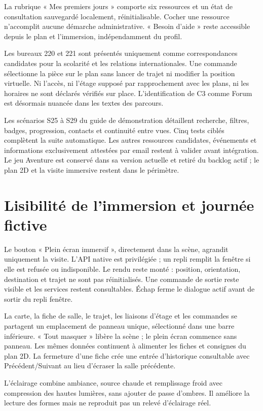\documentclass[11pt,a4paper]{article}
\begin{document}
La rubrique « Mes premiers jours » comporte six ressources et un état de consultation sauvegardé localement, réinitialisable. Cocher une ressource n'accomplit aucune démarche administrative. « Besoin d'aide » reste accessible depuis le plan et l'immersion, indépendamment du profil.

Les bureaux 220 et 221 sont présentés uniquement comme correspondances candidates pour la scolarité et les relations internationales. Une commande sélectionne la pièce sur le plan sans lancer de trajet ni modifier la position virtuelle. Ni l'accès, ni l'étage supposé par rapprochement avec les plans, ni les horaires ne sont déclarés vérifiés sur place. L'identification de C3 comme Forum est désormais nuancée dans les textes des parcours.

Les scénarios S25 à S29 du guide de démonstration détaillent recherche, filtres, badges, progression, contacts et continuité entre vues. Cinq tests ciblés complètent la suite automatique. Les autres ressources candidates, événements et informations exclusivement attestées par email restent à valider avant intégration. Le jeu Aventure est conservé dans sa version actuelle et retiré du backlog actif ; le plan 2D et la visite immersive restent dans le périmètre.


\section{Lisibilité de l'immersion et journée fictive}
Le bouton « Plein écran immersif », directement dans la scène, agrandit uniquement la visite. L'API native est privilégiée ; un repli remplit la fenêtre si elle est refusée ou indisponible. Le rendu reste monté : position, orientation, destination et trajet ne sont pas réinitialisés. Une commande de sortie reste visible et les services restent consultables. Échap ferme le dialogue actif avant de sortir du repli fenêtre.

La carte, la fiche de salle, le trajet, les liaisons d'étage et les commandes se partagent un emplacement de panneau unique, sélectionné dans une barre inférieure. « Tout masquer » libère la scène ; le plein écran commence sans panneau. Les mêmes données continuent à alimenter les fiches et consignes du plan 2D. La fermeture d'une fiche crée une entrée d'historique consultable avec Précédent/Suivant au lieu d'écraser la salle précédente.

L'éclairage combine ambiance, source chaude et remplissage froid avec compression des hautes lumières, sans ajouter de passe d'ombres. Il améliore la lecture des formes mais ne reproduit pas un relevé d'éclairage réel.
\end{document}
